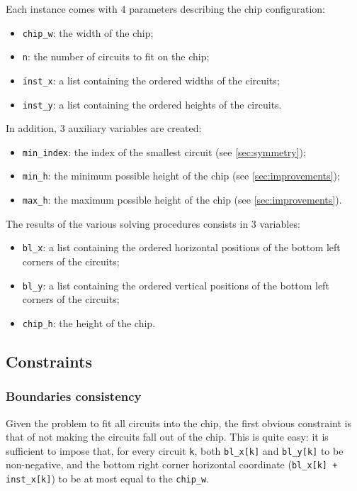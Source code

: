 \documentclass[a4paper, 12pt]{article}
\begin{document}
Each instance comes with 4 parameters describing the chip configuration:
\begin{itemize}
    \item \verb|chip_w|: the width of the chip;
    \item \verb|n|: the number of circuits to fit on the chip;
    \item \verb|inst_x|: a list containing the ordered widths of the circuits;
    \item \verb|inst_y|: a list containing the ordered heights of the circuits.
\end{itemize}
In addition, 3 auxiliary variables are created:
\begin{itemize}
    \item \verb|min_index|: the index of the smallest circuit (see \cref{sec:symmetry});
    \item \verb|min_h|: the minimum possible height of the chip (see \cref{sec:improvements});
    \item \verb|max_h|: the maximum possible height of the chip (see \cref{sec:improvements}).
\end{itemize}
The results of the various solving procedures consists in 3 variables:
\begin{itemize}
    \item \verb|bl_x|: a list containing the ordered horizontal positions of the bottom left corners of the circuits;
    \item \verb|bl_y|: a list containing the ordered vertical positions of the bottom left corners of the circuits;
    \item \verb|chip_h|: the height of the chip.
\end{itemize}


\subsection{Constraints}


\subsubsection{Boundaries consistency}

Given the problem to fit all circuits into the chip, the first obvious constraint is that of not making the circuits fall out of the chip. This is quite easy: it is sufficient to impose that, for every circuit \verb|k|, both \verb|bl_x[k]| and \verb|bl_y[k]| to be non-negative, and the bottom right corner horizontal coordinate (\verb|bl_x[k] + inst_x[k]|) to be at most equal to the \verb|chip_w|.
\end{document}
